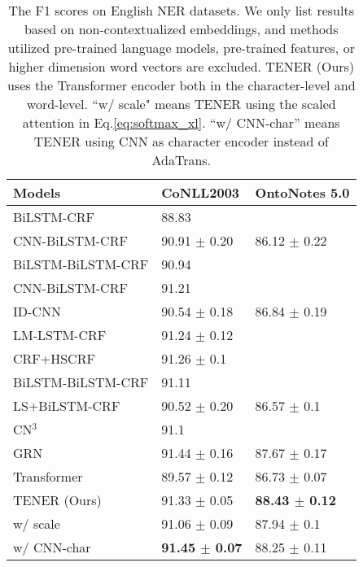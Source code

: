 \documentclass[11pt,a4paper]{article}
\begin{document}
\begin{table}[t]\small \setlength{\tabcolsep}{3pt}
  \centering
\begin{threeparttable}
  \begin{tabular}{p{12em}ll}
  \toprule
  Models                        & CoNLL2003        & OntoNotes 5.0    \\ \midrule
  BiLSTM-CRF \citep{huang2015bidirectional} & 88.83            &                  \\
  CNN-BiLSTM-CRF \citep{DBLP:journals/tacl/ChiuN16}          & 90.91 $\pm$ 0.20 & 86.12 $\pm$ 0.22 \\
  BiLSTM-BiLSTM-CRF \citep{lample2016neural}       & 90.94            &                  \\
  CNN-BiLSTM-CRF \citep{ma2016end}             & 91.21            &                  \\
  ID-CNN \citep{strubell2017fast}       & 90.54 $\pm$ 0.18 & 86.84 $\pm$ 0.19 \\
  LM-LSTM-CRF \citep{DBLP:conf/aaai/LiuSRXG0018}         & 91.24 $\pm$ 0.12 &                  \\
  CRF+HSCRF \citep{ye2018hybrid}           & 91.26 $\pm$ 0.1  &                  \\
  BiLSTM-BiLSTM-CRF \citep{adnan2018}              & 91.11            &             \\
  LS+BiLSTM-CRF \citep{ghaddar2018robust}      & 90.52 $\pm$ 0.20 & 86.57 $\pm$ 0.1  \\
  CN$^3$ \citep{liu2019contextualized}  & 91.1             &                  \\
  GRN \citep{chen2019grn}           & 91.44 $\pm$ 0.16 & 87.67 $\pm$ 0.17 \\
  Transformer                   & 89.57 $\pm$ 0.12 &    86.73 $\pm$ 0.07  \\
  TENER (Ours)               & 91.33 $\pm$ 0.05 & \textbf{88.43 $\pm$ 0.12} \\
  \quad w/ scale                        & 91.06 $\pm$ 0.09     & 87.94 $\pm$ 0.1 \\
  \quad w/ CNN-char              & \textbf{91.45 $\pm$ 0.07} & 88.25 $\pm$ 0.11 \\
  \bottomrule
  \end{tabular}
  \end{threeparttable}
  \caption{The F1 scores on English NER datasets. We only list results based on non-contextualized embeddings, and methods utilized pre-trained language models, pre-trained features, or higher dimension word vectors are excluded. TENER (Ours) uses the Transformer encoder both in the character-level and word-level. ``w/ scale" means TENER using the scaled attention in Eq.\eqref{eq:softmax_xl}.  ``w/ CNN-char'' means TENER using CNN as character encoder instead of AdaTrans.
  } \label{tab:en_ner}
\end{table}
\end{document}
